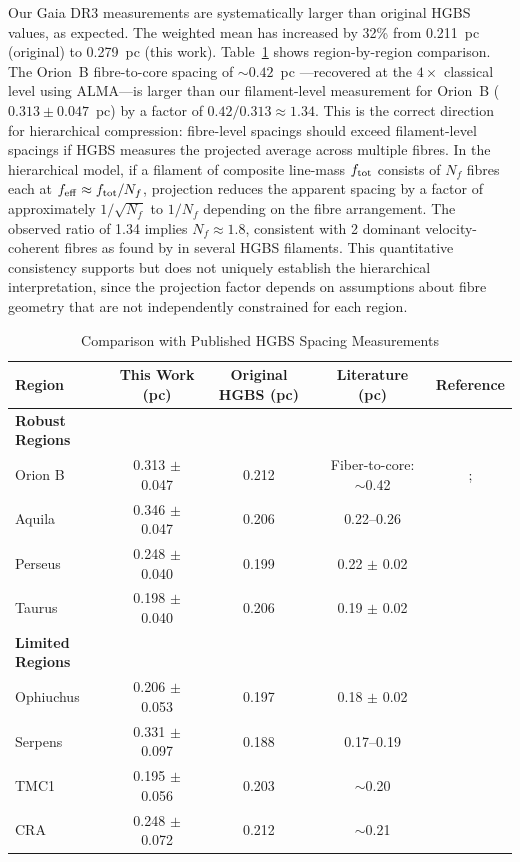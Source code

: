 \documentclass[twoside,twocolumn]{mnras}
\begin{document}
Our Gaia DR3 measurements are systematically larger than original HGBS values, as
expected. The weighted mean has increased by 32\% from 0.211~pc (original) to
0.279~pc (this work). Table~\ref{tab:literature} shows region-by-region comparison.
The Orion~B fibre-to-core spacing of ${\sim}0.42$~pc \citep{Yang2024}---recovered at the
$4\times$ classical level using ALMA---is larger than our filament-level measurement for
Orion~B ($0.313 \pm 0.047$~pc) by a factor of $0.42/0.313 \approx 1.34$. This is the
correct direction for hierarchical compression: fibre-level spacings should exceed
filament-level spacings if HGBS measures the projected average across multiple fibres.
In the hierarchical model, if a filament of composite line-mass $f_{\rm tot}$ consists
of $N_f$ fibres each at $f_{\rm eff} \approx f_{\rm tot}/N_f$, projection reduces the
apparent spacing by a factor of approximately $1/\sqrt{N_f}$ to $1/N_f$ depending on
the fibre arrangement. The observed ratio of 1.34 implies $N_f \approx 1.8$, consistent
with 2 dominant velocity-coherent fibres as found by \citet{Hacar2018} in several HGBS
filaments. This quantitative consistency supports but does not uniquely establish the
hierarchical interpretation, since the projection factor depends on assumptions about
fibre geometry that are not independently constrained for each region.

\begin{table}
\caption{Comparison with Published HGBS Spacing Measurements}
\label{tab:literature}
\begin{tabular}{lcccc}
\toprule
Region & This Work (pc) & Original HGBS (pc) & Literature (pc) & Reference \\
\midrule
\textbf{Robust Regions} &  &  &  &  \\
Orion B & 0.313 $\pm$ 0.047 & 0.212 & Fiber-to-core: $\sim$0.42 & \citet{Konyves2020}; \citet{Yang2024} \\
Aquila  & 0.346 $\pm$ 0.047 & 0.206 & 0.22--0.26 & \citet{Konyves2015} \\
Perseus & 0.248 $\pm$ 0.040 & 0.199 & 0.22 $\pm$ 0.02 & \citet{Andre2016} \\
Taurus  & 0.198 $\pm$ 0.040 & 0.206 & 0.19 $\pm$ 0.02 & \citet{Hacar2013} \\
\midrule
\textbf{Limited Regions} &  &  &  &  \\
Ophiuchus & 0.206 $\pm$ 0.053 & 0.197 & 0.18 $\pm$ 0.02 & \citet{Konyves2020} \\
Serpens  & 0.331 $\pm$ 0.097 & 0.188 & 0.17--0.19 & \citet{Konyves2020} \\
TMC1     & 0.195 $\pm$ 0.056 & 0.203 & $\sim$0.20 & \citet{Hacar2013} \\
CRA      & 0.248 $\pm$ 0.072 & 0.212 & $\sim$0.21 & \citet{Konyves2020} \\
\bottomrule
\end{tabular}
\end{table}
\end{document}
